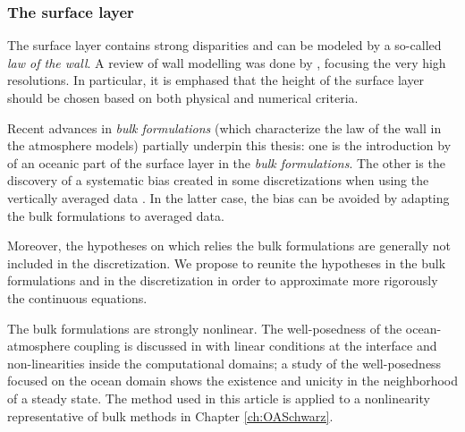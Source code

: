 \subsubsection*{The surface layer}
The surface layer contains strong disparities and can be modeled by a so-called
\textit{law of the wall}. A review of wall modelling was done by
\citep{larsson_large_2016}, focusing the very high resolutions.
In particular, it is emphased that the height of the surface layer
should be chosen based on both physical and numerical criteria.
\par
Recent advances in \textit{bulk formulations}
(which characterize the law of the wall in the atmosphere models)
partially underpin this thesis:
one is the introduction by \citep{pelletier_two-sided_2021}
of an oceanic part of the surface layer in the \textit{bulk formulations}.
The other is the discovery of a systematic bias
created in some discretizations when using the vertically
averaged data \citep{nishizawa_surface_2018}. In the latter case,
the bias can be avoided by adapting the bulk formulations to averaged
data.
\par
Moreover, the hypotheses on which relies the bulk formulations
are generally not included in the discretization.
We propose to reunite the hypotheses in the bulk formulations
and in the discretization in order to
approximate more rigorously the continuous equations.
\par
The bulk formulations are strongly nonlinear. The
well-posedness of the ocean-atmosphere coupling is discussed
in \citep{lions_mathematical_1995} with linear conditions at
the interface and non-linearities inside the computational domains;
a study of the well-posedness focused on the ocean domain
\citep{chacon-rebollo_existence_2014} shows the existence and
unicity in the neighborhood of a steady state. The method
used in this article is applied to a nonlinearity
representative of bulk methods in Chapter
\ref{ch:OASchwarz}.
%
